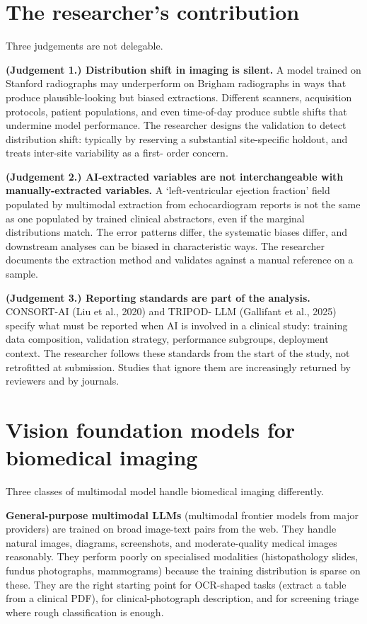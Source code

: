 \documentclass[
  letterpaper,
  11pt]{scrbook}
\begin{document}
\section{The researcher's
contribution}\label{sec-multimodal-medical-human}

Three judgements are not delegable.

\textbf{(Judgement 1.) Distribution shift in imaging is silent.} A model
trained on Stanford radiographs may underperform on Brigham radiographs
in ways that produce plausible-looking but biased extractions. Different
scanners, acquisition protocols, patient populations, and even
time-of-day produce subtle shifts that undermine model performance. The
researcher designs the validation to detect distribution shift:
typically by reserving a substantial site-specific holdout, and treats
inter-site variability as a first- order concern.

\textbf{(Judgement 2.) AI-extracted variables are not interchangeable
with manually-extracted variables.} A `left-ventricular ejection
fraction' field populated by multimodal extraction from echocardiogram
reports is not the same as one populated by trained clinical
abstractors, even if the marginal distributions match. The error
patterns differ, the systematic biases differ, and downstream analyses
can be biased in characteristic ways. The researcher documents the
extraction method and validates against a manual reference on a sample.

\textbf{(Judgement 3.) Reporting standards are part of the analysis.}
CONSORT-AI (Liu et al., 2020) and TRIPOD- LLM ({Gallifant et al.}, 2025)
specify what must be reported when AI is involved in a clinical study:
training data composition, validation strategy, performance subgroups,
deployment context. The researcher follows these standards from the
start of the study, not retrofitted at submission. Studies that ignore
them are increasingly returned by reviewers and by journals.

\section{Vision foundation models for biomedical
imaging}\label{vision-foundation-models-for-biomedical-imaging}

Three classes of multimodal model handle biomedical imaging differently.

\textbf{General-purpose multimodal LLMs} (multimodal frontier models
from major providers) are trained on broad image-text pairs from the
web. They handle natural images, diagrams, screenshots, and
moderate-quality medical images reasonably. They perform poorly on
specialised modalities (histopathology slides, fundus photographs,
mammograms) because the training distribution is sparse on these. They
are the right starting point for OCR-shaped tasks (extract a table from
a clinical PDF), for clinical-photograph description, and for screening
triage where rough classification is enough.
\end{document}
